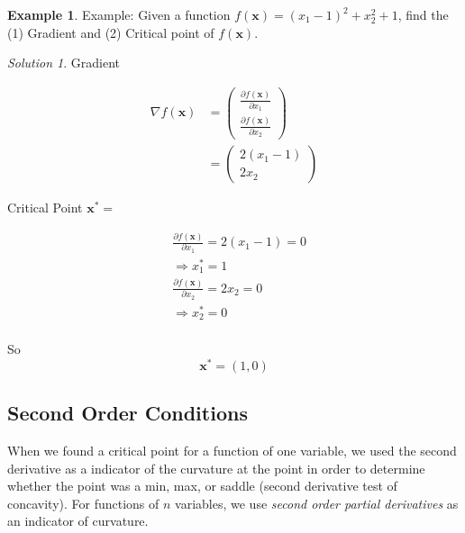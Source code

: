 \documentclass[
]{book}
\theoremstyle{definition}
\theoremstyle{definition}
\newtheorem{example}{Example}[chapter]
\theoremstyle{definition}
\theoremstyle{definition}
\theoremstyle{remark}
\newtheorem*{solution}{Solution}
\begin{document}
\begin{example}
\protect\hypertarget{exm:unnamed-chunk-241}{}{\label{exm:unnamed-chunk-241} }
Example: Given a function \(f(\mathbf{x})=(x_1-1)^2+x_2^2+1\), find the (1) Gradient and (2) Critical point of \(f(\mathbf{x})\).
\end{example}

\begin{solution}
{}Gradient

\begin{align*}
\nabla f(\mathbf{x}) &= \begin{pmatrix}\frac{\partial f(\mathbf{x})}{\partial x_1}\\ \frac{\partial f(\mathbf{x})}{\partial x_2} \end{pmatrix}\\
&= \begin{pmatrix} 2(x_1-1)\\ 2x_2 \end{pmatrix}
\end{align*}

Critical Point \(\mathbf{x}^* =\)

\begin{align*}
&\frac{\partial f(\mathbf{x})}{\partial x_1} = 2(x_1-1) = 0\\
&\Rightarrow x_1^* = 1\\
&\frac{\partial f(\mathbf{x})}{\partial x_2} = 2x_2 = 0\\
&\Rightarrow   x_2^* = 0\\
\end{align*}

So \[\mathbf{x}^* = (1,0)\]
\end{solution}

\hypertarget{second-order-conditions}{%
\subsection*{Second Order Conditions}\label{second-order-conditions}}

When we found a critical point for a function of one variable, we used the second derivative as a indicator of the curvature at the point in order to determine whether the point was a min, max, or saddle (second derivative test of concavity). For functions of \(n\) variables, we use \emph{second order partial derivatives} as an indicator of curvature.
\end{document}
